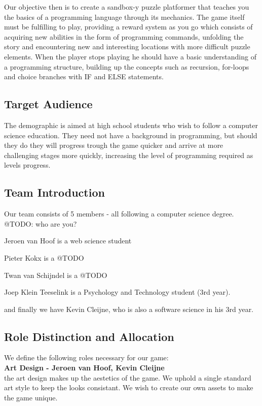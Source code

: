 \documentclass[a4paper,twoside,12pt]{article}
\begin{document}
Our objective then is to create a sandbox-y puzzle platformer that teaches you the basics of a programming language through its mechanics. The game itself must be fulfilling to play, providing a reward system as you go which consists of acquiring new abilities in the form of programming commands, unfolding the story and encountering new and interesting locations with more difficult puzzle elements. When the player stops playing he should have a basic understanding of a programming structure, building up the concepts such as recursion, for-loops and choice branches with IF and ELSE statements.


\subsection{Target Audience}
The demographic is aimed at high school students who wish to follow a computer science education. They need not have a background in programming, but should they do they will progress trough the game quicker and arrive at more challenging stages more quickly, increasing the level of programming required as levels progress.

\subsection{Team Introduction}

Our team consists of 5 members - all following a computer science degree.
@TODO: who are you? 

Jeroen van Hoof is a web science student

Pieter Kokx is a @TODO

Twan van Schijndel is a @TODO

Joep Klein Teeselink is a Psychology and Technology student (3rd year).

and finally we have Kevin Cleijne, who is also a software science in his 3rd year.

\subsection{Role Distinction and Allocation}
We define the following roles necessary for our game: \\

\textbf{Art Design - Jeroen van Hoof, Kevin Cleijne} \\
the art design makes up the aestetics of the game. We uphold a single standard art style to keep the looks consistant. We wish to create our own assets to make the game unique.\\
\end{document}
